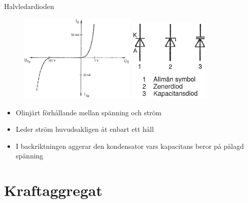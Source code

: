 \documentclass{beamer}
\begin{document}
\begin{frame}{Halvledardioden}

\begin{figure}[h]
\includegraphics[width=0.5\textwidth]{images/cropped_pdfs/bild_2_2-13.pdf}
\includegraphics[width=0.35\textwidth]{images/cropped_pdfs/bild_2_2-14.pdf}
\label{fig:BildII1-16}
\end{figure}

\begin{itemize}
  \item Olinjärt förhållande mellan spänning och ström
  \item Leder ström huvudsakligen åt enbart ett håll
  \item I backriktningen aggerar den kondensator vars kapacitans beror på pålagd spänning
  \end{itemize}
\end{frame}

\section{Kraftaggregat}
\end{document}

